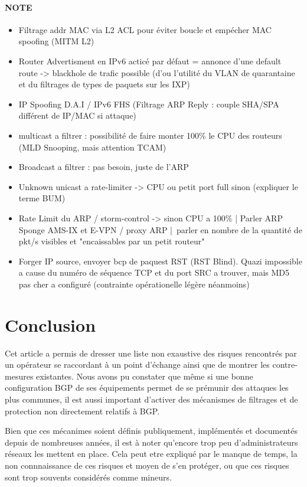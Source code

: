 \paragraph{NOTE}
\begin{itemize}
\item Filtrage addr MAC via L2 ACL pour éviter boucle et empécher MAC spoofing (MITM L2)
\item Router Advertisment en IPv6 acticé par défaut = annonce d'une default route -> blackhole de trafic possible (d'ou l'utilité du VLAN de quarantaine et du filtrages de types de paquets sur les IXP)
\item IP Spoofing D.A.I / IPv6 FHS (Filtrage ARP Reply : couple SHA/SPA différent de IP/MAC si attaque)
\item multicast a filtrer : possibilité de faire monter 100\% le CPU des routeurs (MLD Snooping, mais attention TCAM)
\item Broadcast a filtrer : pas besoin, juste de l'ARP
\item Unknown unicast a rate-limiter -> CPU ou petit port full sinon (expliquer le terme BUM)
\item Rate Limit du ARP / storm-control  -> sinon CPU a 100\% | Parler ARP Sponge AMS-IX et E-VPN / proxy ARP | parler en nombre de la quantité de pkt/s visibles et "encaissables par un petit routeur"
\item Forger IP source, envoyer bcp de paquest RST (RST Blind). Quazi impossible a cause du numéro de séquence TCP et du port SRC a trouver, mais MD5 pas cher a configuré (contrainte opérationelle légère néanmoins)

\end{itemize}


\section{Conclusion}

Cet article a permis de dresser une liste non exaustive des risques rencontrés par un opérateur se raccordant à un point d'échange ainsi que de montrer les contre-mesures existantes.
Nous avons pu constater que même si une bonne configuration BGP de ses équipements permet de se prémunir des attaques les plus communes, il est aussi important d'activer des mécanismes de filtrages et de protection non directement relatifs à BGP.

Bien que ces mécanimes soient définis publiquement, implémentés et documentés depuis de nombreuses années, il est à noter qu'encore trop peu d'administrateurs réseaux les mettent en place. Cela peut etre expliqué par le manque de temps, la non connnaissance de ces risques et moyen de s'en protéger, ou que ces risques sont trop souvents considérés comme mineurs.

